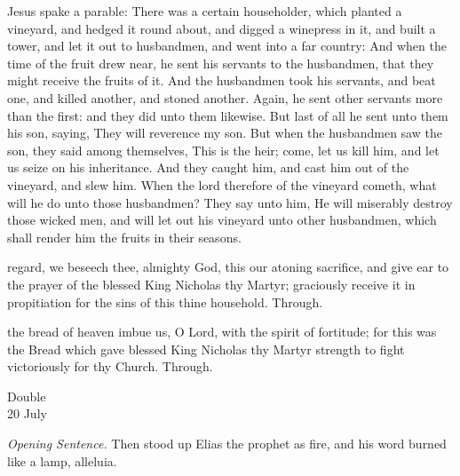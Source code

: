  Jesus spake a parable: There was a certain householder, which planted a vineyard, and hedged it round about, and digged a winepress in it, and built a tower, and let it out to husbandmen, and went into a far country: And when the time of the fruit drew near, he sent his servants to the husbandmen, that they might receive the fruits of it. And the husbandmen took his servants, and beat one, and killed another, and stoned another. Again, he sent other servants more than the first: and they did unto them likewise. But last of all he sent unto them his son, saying, They will reverence my son. But when the husbandmen saw the son, they said among themselves, This is the heir; come, let us kill him, and let us seize on his inheritance. And they caught him, and cast him out of the vineyard, and slew him. When the lord therefore of the vineyard cometh, what will he do unto those husbandmen? They say unto him, He will miserably destroy those wicked men, and will let out his vineyard unto other husbandmen, which shall render him the fruits in their seasons.


\secret
{} regard, we beseech thee, almighty God, this our atoning sacrifice, and give ear to the prayer of the blessed King Nicholas thy Martyr; graciously receive it in propitiation for the sins of this thine household. Through.


\postcommunion
{} the bread of heaven imbue us, O Lord, with the spirit of fortitude; for this was the Bread which gave blessed King Nicholas thy Martyr strength to fight victoriously for thy Church. Through.


\begin{inhead}
    {Double\\
20 July}
\end{inhead}\par\noindent
\textit{Opening Sentence.} Then stood up Elias the prophet as fire, and his word burned like a lamp, alleluia.\par

